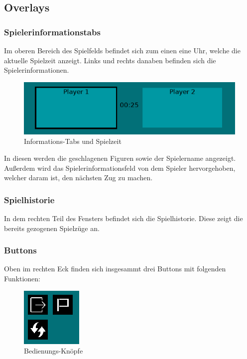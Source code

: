 \documentclass[a4paper, 10pt]{scrartcl}
\begin{document}
\subsection{Overlays}

\subsubsection{Spielerinformationstabs}
Im oberen Bereich des Spielfelds befindet sich zum einen eine Uhr, welche die aktuelle Spielzeit anzeigt. Links und rechts danaben befinden sich die Spielerinformationen.

\begin{figure}[h]
        \centering
        \includegraphics[scale=0.7]{assets/infotabs.PNG}
        \caption{Informations-Tabs und Spielzeit}
\end{figure}
In diesen werden die geschlagenen Figuren sowie der Spielername angezeigt. Außerdem wird das Spielerinformationsfeld von dem Spieler hervorgehoben, welcher daram ist, den
nächsten Zug zu machen.

\subsubsection{Spielhistorie}

In dem rechten Teil des Fensters befindet sich die Spielhistorie. Diese zeigt die bereits gezogenen Spielzüge an. 

\subsubsection{Buttons}
Oben im rechten Eck finden sich insgesammt drei Buttons mit folgenden Funktionen:
\begin{figure}
        \centering
        \includegraphics{assets/Buttons.PNG}
        \caption{Bedienungs-Knöpfe}
\end{figure}
\end{document}
